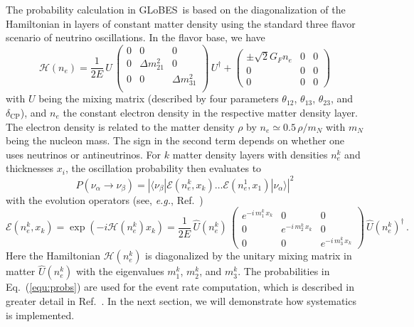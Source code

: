 \documentclass[12pt,a4paper]{article}
\newcommand{\eg}{{\it e.g.}}
\newcommand{\eq}{Eq.}
\newcommand{\Ref}{Ref.}
\newcommand{\ldm}{\Delta m_{31}^2}
\newcommand{\sdm}{\Delta m_{21}^2}
\newcommand{\deltacp}{\delta_{\mathrm{CP}}}
\newcommand{\GLOBES}{{\sf GLoBES}}
\newcommand{\equ}[1]{\eq~(\ref{equ:#1})}
\begin{document}
The probability calculation in \GLOBES\ is based on the diagonalization of the
Hamiltonian in layers of constant matter density using the standard three flavor
scenario of neutrino oscillations. In the flavor base, we have
\begin{equation}
\mathcal{H}(n_e) = \frac{1}{2E} \, U \,
\left(
\begin{array}{ccc}
0 & 0 & 0 \\
0  & \sdm & 0 \\
0  & 0 & \ldm \\
\end{array}
\right) \,
U^\dagger + 
\left(
\begin{array}{ccc}
 \pm \sqrt{2} G_F n_e & 0 & 0 \\
0 & 0 & 0 \\
0 & 0 & 0 
\end{array}
\right)
\label{equ:ham}
\end{equation}
with $U$ being the mixing matrix (described by four parameters $\theta_{12}$, $\theta_{13}$, $\theta_{23}$, and $\deltacp$), and $n_e$ the constant electron density
in the respective matter density layer. The electron density is related to the matter density $\rho$ by 
$n_e \simeq 0.5 \, \rho/m_N$ with $m_N$ being the nucleon mass. The sign in the second term depends on whether one
uses neutrinos or antineutrinos. For $k$ matter density layers with densities
$n^k_e$ and thicknesses $x_i$, the oscillation probability then evaluates to
\begin{equation}
P(\nu_\alpha \rightarrow \nu_\beta) = \left| \langle \nu_\beta | \mathcal{E}(n^k_e, x_k) \hdots  \mathcal{E}(n^1_e, x_1) | \nu_\alpha \rangle \right|^2
\label{equ:probs}
\end{equation}
with the evolution operators (see, \eg, \Ref~\cite{Ohlsson:1999um})
\begin{equation}
  \mathcal{E}(n^k_e, x_k) = \exp \left( -i \mathcal{H}(n^k_e) x_k \right) = \frac{1}{2E} \, \hat{U}(n^k_e) \, \left( \begin{array}{ccc}
e^{-i \, m_1^k \, x_k} & 0 & 0 \\
0 &  e^{-i \, m_2^k \, x_k} & 0 \\
0 & 0 & e^{-i \, m_3^k \, x_k} 
\end{array}
\right) \, \hat{U}(n^k_e)^\dagger \, .
\end{equation}
Here the Hamiltonian $\mathcal{H}(n^k_e)$ is diagonalized by the unitary mixing matrix in matter $\hat{U}(n^k_e)$
with the eigenvalues $m_1^k$, $m_2^k$, and $m_3^k$. The probabilities in \equ{probs} are used for the
event rate computation, which is described in greater detail in \Ref~\cite{Huber:2004ka}. In the next section,
we will demonstrate how systematics is implemented.
\end{document}
